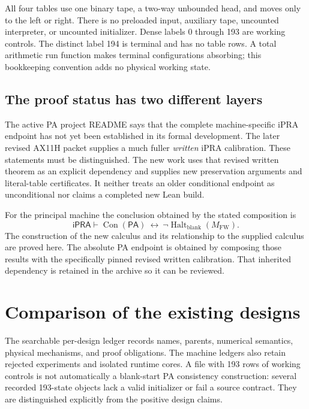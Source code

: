 \documentclass[11pt,a4paper]{article}
\theoremstyle{definition}\newtheorem{definition}[theorem]{Definition}
\theoremstyle{remark}\newtheorem{remark}[theorem]{Remark}
\newcommand{\ipra}{\mathsf{iPRA}}
\newcommand{\PA}{\mathsf{PA}}
\newcommand{\Con}{\operatorname{Con}}
\newcommand{\Halt}{\operatorname{Halt}}
\begin{document}
All four tables use one binary tape, a two-way unbounded head, and moves
only to the left or right. There is no preloaded input, auxiliary tape,
uncounted interpreter, or uncounted initializer. Dense labels 0 through 193
are working controls. The distinct label 194 is terminal and has no table
rows. A total arithmetic run function makes terminal configurations
absorbing; this bookkeeping convention adds no physical working state.

\subsection{The proof status has two different layers}

The active PA project README says that the complete machine-specific iPRA
endpoint has not yet been established in its formal development\cite{pa}. The later
revised AX11H packet supplies a much fuller \emph{written} iPRA calibration.
These statements must be distinguished\cite{ax11h}. The new work uses that revised
written theorem as an explicit dependency and supplies new preservation
arguments and literal-table certificates. It neither treats an older
conditional endpoint as unconditional nor claims a completed new Lean build.

For the principal machine the conclusion obtained by the stated composition is
\[
 \ipra\vdash
 \Con(\PA)\ \longleftrightarrow\
 \neg\Halt_{\mathrm{blank}}(M_{\mathrm{FW}}).
\]
The construction of the new calculus and its relationship to the supplied
calculus are proved here. The absolute PA endpoint is obtained by composing
those results with the specifically pinned revised written calibration.
That inherited dependency is retained in the archive so it can be reviewed.

\section{Comparison of the existing designs}



The searchable per-design ledger records names, parents, numerical
semantics, physical mechanisms, and proof obligations. The machine ledgers
also retain rejected experiments and isolated runtime cores. A file with
193 rows of working controls is not automatically a blank-start PA
consistency construction: several recorded 193-state objects lack a valid
initializer or fail a source contract. They are distinguished explicitly
from the positive design claims.
\end{document}
